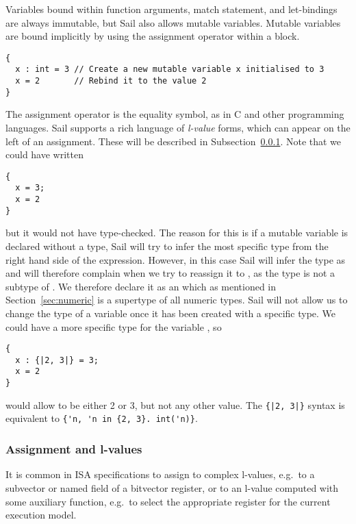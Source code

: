 Variables bound within function arguments, match statement, and
let-bindings are always immutable, but Sail also allows mutable
variables. Mutable variables are bound implicitly by using the
assignment operator within a block.
\begin{lstlisting}
{
  x : int = 3 // Create a new mutable variable x initialised to 3
  x = 2       // Rebind it to the value 2
}
\end{lstlisting}
The assignment operator is the equality symbol, as in C and other
programming languages. Sail supports a rich language of \emph{l-value}
forms, which can appear on the left of an assignment. These will be
described in Subsection~\ref{sec:lexp}. Note that we could have
written
\begin{lstlisting}
{
  x = 3;
  x = 2
}
\end{lstlisting}
but it would not have type-checked. The reason for this is if a
mutable variable is declared without a type, Sail will try to infer
the most specific type from the right hand side of the
expression. However, in this case Sail will infer the type as
 and will therefore complain when we try to reassign it to
, as the type  is not a subtype of . We
therefore declare it as an  which as mentioned in
Section~\ref{sec:numeric} is a supertype of all numeric types. Sail
will not allow us to change the type of a variable once it has been
created with a specific type. We could have a more specific type for
the variable , so
\begin{lstlisting}
{
  x : {|2, 3|} = 3;
  x = 2
}
\end{lstlisting}
would allow  to be either 2 or 3, but not any other value. The
\lstinline+{|2, 3|}+ syntax is equivalent to \lstinline+{'n, 'n in {2, 3}. int('n)}+.

\subsubsection{Assignment and l-values}
\label{sec:lexp}

It is common in ISA specifications to assign to complex l-values,
e.g.~to a subvector or named field of a bitvector register, or to an
l-value computed with some auxiliary function, e.g.~to select the
appropriate register for the current execution model.

